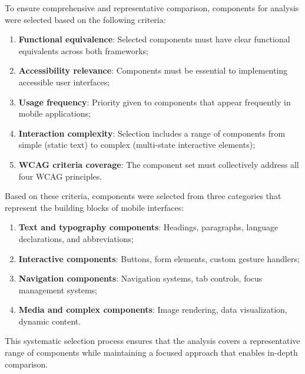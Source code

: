 To ensure comprehensive and representative comparison, components for analysis were selected based on the following criteria:

\begin{enumerate}
    \item \textbf{Functional equivalence}: Selected components must have clear functional equivalents across both frameworks;
    
    \item \textbf{Accessibility relevance}: Components must be essential to implementing accessible user interfaces;
    
    \item \textbf{Usage frequency}: Priority given to components that appear frequently in mobile applications;
    
    \item \textbf{Interaction complexity}: Selection includes a range of components from simple (static text) to complex (multi-state interactive elements);
    
    \item \textbf{WCAG criteria coverage}: The component set must collectively address all four WCAG principles.
\end{enumerate}

Based on these criteria, components were selected from three categories that represent the building blocks of mobile interfaces:

\begin{enumerate}
    \item \textbf{Text and typography components}: Headings, paragraphs, language declarations, and abbreviations;
    
    \item \textbf{Interactive components}: Buttons, form elements, custom gesture handlers;
    
    \item \textbf{Navigation components}: Navigation systems, tab controls, focus management systems;
    
    \item \textbf{Media and complex components}: Image rendering, data visualization, dynamic content.
\end{enumerate}

This systematic selection process ensures that the analysis covers a representative range of components while maintaining a focused approach that enables in-depth comparison.

